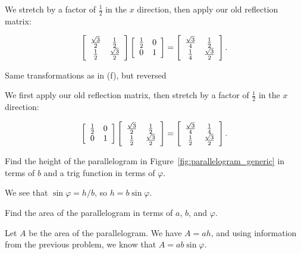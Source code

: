 \documentclass[../key.tex]{subfiles}
\begin{document}
We stretch by a factor of $\frac{1}{2}$ in the $x$ direction, then apply our old reflection matrix:

$$\left[\begin{array}{cc} \frac{\sqrt{3}}{2} & \frac{1}{2} \\ \frac{1}{2} & \frac{\sqrt{3}}{2} \end{array}\right]\left[\begin{array}{cc} \frac{1}{2} & 0 \\ 0 & 1 \end{array}\right] = \left[\begin{array}{cc} \frac{\sqrt{3}}{4} & \frac{1}{2} \\ \frac{1}{4} & \frac{\sqrt{3}}{2} \end{array}\right].$$

\begin{inner_problem}
\item Same transformations as in (f), but reversed \label{prob:matrix_prod_end}
\end{inner_problem}

We first apply our old reflection matrix, then stretch by a factor of $\frac{1}{2}$ in the $x$ direction:

$$\left[\begin{array}{cc} \frac{1}{2} & 0 \\ 0 & 1 \end{array}\right]\left[\begin{array}{cc} \frac{\sqrt{3}}{2} & \frac{1}{2} \\ \frac{1}{2} & \frac{\sqrt{3}}{2} \end{array}\right] = \left[\begin{array}{cc} \frac{\sqrt{3}}{4} & \frac{1}{4} \\ \frac{1}{2} & \frac{\sqrt{3}}{2} \end{array}\right].$$

\begin{outer_problem}
\item
\end{outer_problem}

\begin{inner_problem}[start=1]
\item Find the height of the parallelogram in Figure~\ref{fig:parallelogram_generic} in terms of $b$ and a trig function in terms of $\varphi$.
\end{inner_problem}

We see that $\sin\varphi = h/b$, so $h = b\sin\varphi$.

\begin{inner_problem}
\item Find the area of the parallelogram in terms of $a$, $b$, and $\varphi$.
\end{inner_problem}

Let $A$ be the area of the parallelogram. We have $A=ah$, and using information from the previous problem, we know that $A = ab\sin\varphi$.
\end{document}
